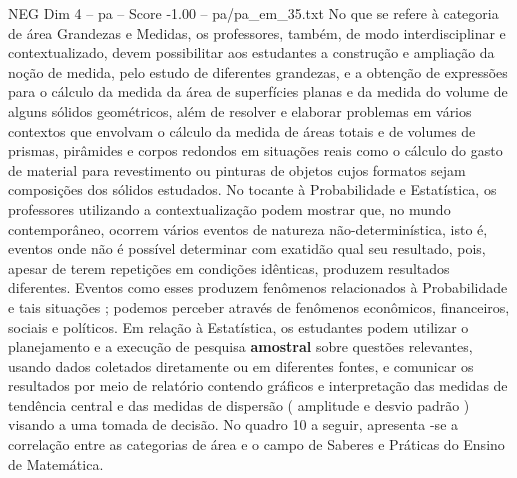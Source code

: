 \begin{textsample}{NEG Dim 4 – pa – Score -1.00 – pa/pa\_em\_35.txt}
No que se refere à categoria de área Grandezas e Medidas, os professores, também, de modo interdisciplinar e contextualizado, devem possibilitar aos estudantes a construção e ampliação da noção de medida, pelo estudo de diferentes grandezas, e a obtenção de expressões para o cálculo da medida da área de superfícies planas e da medida do volume de alguns sólidos geométricos, além de resolver e elaborar problemas em vários contextos que envolvam o cálculo da medida de áreas totais e de volumes de prismas, pirâmides e corpos redondos em situações reais como o cálculo do gasto de material para revestimento ou pinturas de objetos cujos formatos sejam composições dos sólidos estudados.
No tocante à Probabilidade e Estatística, os professores utilizando a contextualização podem mostrar que, no mundo contemporâneo, ocorrem vários eventos de natureza não-determinística, isto é, eventos onde não é possível determinar com exatidão qual seu resultado, pois, apesar de terem repetições em condições idênticas, produzem resultados diferentes.
Eventos como esses produzem fenômenos relacionados à Probabilidade e tais situações ; podemos perceber através de fenômenos econômicos, financeiros, sociais e políticos.
Em relação à Estatística, os estudantes podem utilizar o planejamento e a execução de pesquisa \textbf{amostral} sobre questões relevantes, usando dados coletados diretamente ou em diferentes fontes, e comunicar os resultados por meio de relatório contendo gráficos e interpretação das medidas de tendência central e das medidas de dispersão ( amplitude e desvio padrão ) visando a uma tomada de decisão.
No quadro 10 a seguir, apresenta -se a correlação entre as categorias de área e o campo de Saberes e Práticas do Ensino de Matemática.

\end{textsample}
